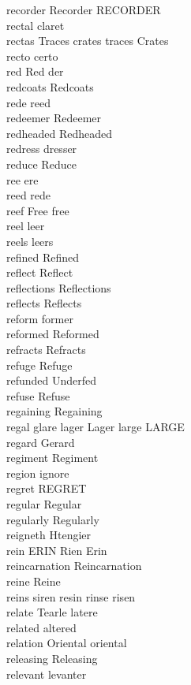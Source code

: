 recorder Recorder RECORDER\\
rectal claret\\
rectas Traces crates traces Crates\\
recto certo\\
red Red der\\
redcoats Redcoats\\
rede reed\\
redeemer Redeemer\\
redheaded Redheaded\\
redress dresser\\
reduce Reduce\\
ree ere\\
reed rede\\
reef Free free\\
reel leer\\
reels leers\\
refined Refined\\
reflect Reflect\\
reflections Reflections\\
reflects Reflects\\
reform former\\
reformed Reformed\\
refracts Refracts\\
refuge Refuge\\
refunded Underfed\\
refuse Refuse\\
regaining Regaining\\
regal glare lager Lager large LARGE\\
regard Gerard\\
regiment Regiment\\
region ignore\\
regret REGRET\\
regular Regular\\
regularly Regularly\\
reigneth Htengier\\
rein ERIN Rien Erin\\
reincarnation Reincarnation\\
reine Reine\\
reins siren resin rinse risen\\
relate Tearle latere\\
related altered\\
relation Oriental oriental\\
releasing Releasing\\
relevant levanter\\
